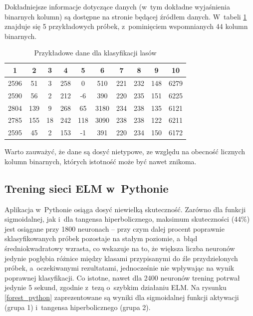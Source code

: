 \documentclass[pl]{minipw} %
\begin{document}
Dokładniejsze informacje dotyczące danych (w~tym dokładne wyjaśnienia binarnych kolumn) są dostępne na stronie będącej źródłem danych. W~tabeli \ref{forest_first_5} znajduje się 5 przykładowych próbek, z~pominięciem wspomnianych 44 kolumn binarnych.
\begin{table}[H]
\caption{Przykładowe dane dla klasyfikacji lasów}
\label{forest_first_5}
\centering
\begin{tabular}{|c|c|c|c|c|c|c|c|c|c|}
\hline
\textbf{1} & \textbf{2} & \textbf{3} & \textbf{4} & \textbf{5} & \textbf{6} & \textbf{7} & \textbf{8} & \textbf{9} & \textbf{10} \\
\hline
2596 & 51 & 3 & 258 & 0 & 510 & 221 & 232 & 148 & 6279 \\
2590 & 56 & 2 & 212 & -6 & 390 & 220 & 235 & 151 & 6225 \\
2804 & 139 & 9 & 268 & 65 & 3180 & 234 & 238 & 135 & 6121 \\
2785 & 155 & 18 & 242 & 118 & 3090 & 238 & 238 & 122 & 6211 \\
2595 & 45 & 2 & 153 & -1 & 391 & 220 & 234 & 150 & 6172 \\
\hline
\end{tabular}
\end{table}
\label{opis-lasy}
Warto zauważyć, że dane są dosyć nietypowe, ze względu na obecność licznych kolumn binarnych, których istotność może być nawet znikoma.
\subsection{Trening sieci ELM w~Pythonie}
Aplikacja w~Pythonie osiąga dosyć niewielką skuteczność. Zarówno dla funkcji sigmoidalnej, jak i~dla tangensa hiperbolicznego, maksimum skuteczności (44\%) jest osiągane przy 1800 neuronach -- przy czym dalej procent poprawnie sklasyfikowanych próbek pozostaje na stałym poziomie, a~błąd średniokwadratowy wzrasta, co wskazuje na to, że większa liczba neuronów jedynie pogłębia różnice między klasami przypisanymi do źle przydzielonych próbek, a~oczekiwanymi rezultatami, jednocześnie nie wpływając na wynik poprawnej klasyfikacji. Co istotne, nawet dla 2400 neuronów trening potrwał jedynie 5 sekund, zgodnie z~tezą o~szybkim działaniu ELM. 
Na rysunku \ref{forest_python} zaprezentowane są wyniki dla sigmoidalnej funkcji aktywacji (grupa 1) i~tangensa hiperbolicznego (grupa 2). 
\label{python-lasy}
\end{document}
